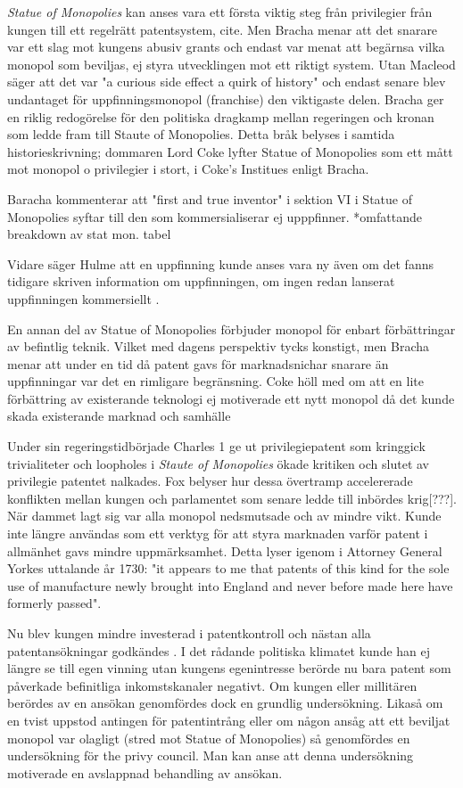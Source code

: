 \emph{Statue of Monopolies} kan anses vara ett första viktig steg från privilegier från kungen till ett
regelrätt patentsystem, cite. Men Bracha\cite{bracha} menar att det snarare var ett slag mot kungens abusiv grants
och endast var menat att begärnsa vilka monopol som beviljas, ej styra utvecklingen mot ett riktigt
system. Utan Macleod \cite{macleod2} säger att det var "a curious side effect a quirk of history" och endast
senare blev undantaget för uppfinningsmonopol (franchise) den viktigaste delen. Bracha ger en riklig redogörelse för den politiska dragkamp mellan regeringen och kronan som ledde fram till Staute of Monopolies. Detta bråk belyses i samtida historieskrivning; dommaren Lord Coke lyfter Statue of Monopolies som ett mått mot monopol o privilegier i stort, i Coke's Institues \cite{coke} enligt Bracha\cite{bracha}.

Baracha kommenterar att "first and true inventor" i sektion VI i Statue of Monopolies syftar till den som kommersialiserar ej upppfinner.
*omfattande breakdown av stat mon. tabel

Vidare säger Hulme att en uppfinning kunde anses vara ny även om det fanns tidigare skriven information om uppfinningen, om ingen redan lanserat uppfinningen kommersiellt \cite{hulme}.

En annan del av Statue of Monopolies förbjuder monopol för enbart förbättringar av befintlig teknik. Vilket med dagens perspektiv tycks konstigt, men Bracha menar att under en tid då patent gavs för marknadsnichar snarare än uppfinningar var det en rimligare begränsning.
Coke höll med om att en lite förbättring av existerande teknologi ej motiverade ett nytt monopol då det kunde skada existerande marknad och samhälle\cite{bracha}

Under sin regeringstidbörjade Charles 1 ge ut privilegiepatent som kringgick trivialiteter och loopholes i \emph{Staute of
Monopolies} ökade kritiken och slutet av privilegie patentet nalkades. Fox \cite{Fox} belyser hur dessa övertramp accelererade
konflikten mellan kungen och parlamentet som senare ledde till inbördes krig[???]. När dammet lagt sig
var alla monopol nedsmutsade och av mindre vikt. Kunde inte längre användas som ett verktyg för att styra
marknaden varför patent i allmänhet gavs mindre uppmärksamhet. Detta lyser igenom i Attorney General Yorkes uttalande år 1730: "it appears to me that patents of this kind for the sole use of manufacture newly brought into England and never before made here have formerly passed"\cite{macleod2}. 

Nu blev kungen mindre investerad i patentkontroll och nästan alla
patentansökningar godkändes \cite{bracha}. I det rådande politiska klimatet kunde han ej längre se till
egen vinning utan kungens egenintresse berörde nu bara patent som påverkade befinitliga inkomstskanaler
negativt\cite{macleod2}. Om kungen eller millitären berördes av en ansökan genomfördes dock en grundlig
undersökning. Likaså om en tvist uppstod antingen för patentintrång eller om någon ansåg att ett beviljat
monopol var olagligt (stred mot Statue of Monopolies) så genomfördes en undersökning för the privy
council. Man kan anse att denna undersökning motiverade en avslappnad behandling av ansökan.

